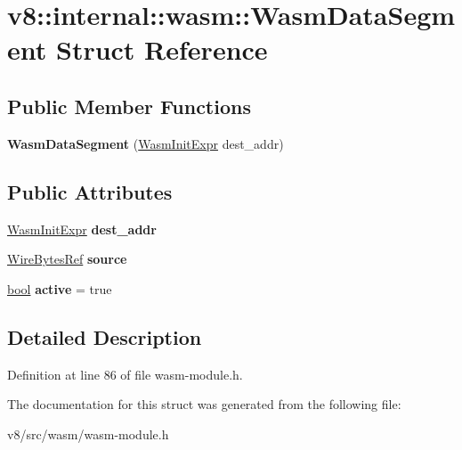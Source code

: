 \hypertarget{structv8_1_1internal_1_1wasm_1_1WasmDataSegment}{}\section{v8\+:\+:internal\+:\+:wasm\+:\+:Wasm\+Data\+Segment Struct Reference}
\label{structv8_1_1internal_1_1wasm_1_1WasmDataSegment}
\subsection*{Public Member Functions}
\begin{DoxyCompactItemize}
\item 
\mbox{\label{structv8_1_1internal_1_1wasm_1_1WasmDataSegment_ad3c55e5f1f4ba3ac91b1ef29c3990f75}} 
{\bfseries Wasm\+Data\+Segment} (\mbox{\hyperlink{structv8_1_1internal_1_1wasm_1_1WasmInitExpr}{Wasm\+Init\+Expr}} dest\+\_\+addr)
\end{DoxyCompactItemize}
\subsection*{Public Attributes}
\begin{DoxyCompactItemize}
\item 
\mbox{\label{structv8_1_1internal_1_1wasm_1_1WasmDataSegment_a1dded0e91177c4ba7d1f041f557d72dc}} 
\mbox{\hyperlink{structv8_1_1internal_1_1wasm_1_1WasmInitExpr}{Wasm\+Init\+Expr}} {\bfseries dest\+\_\+addr}
\item 
\mbox{\label{structv8_1_1internal_1_1wasm_1_1WasmDataSegment_ad002288f070d114ec32dd93c4874ee5b}} 
\mbox{\hyperlink{classv8_1_1internal_1_1wasm_1_1WireBytesRef}{Wire\+Bytes\+Ref}} {\bfseries source}
\item 
\mbox{\label{structv8_1_1internal_1_1wasm_1_1WasmDataSegment_a12e17e3fa84bb4207424e2b348187aa8}} 
\mbox{\hyperlink{classbool}{bool}} {\bfseries active} = true
\end{DoxyCompactItemize}


\subsection{Detailed Description}


Definition at line 86 of file wasm-\/module.\+h.



The documentation for this struct was generated from the following file\+:\begin{DoxyCompactItemize}
\item 
v8/src/wasm/wasm-\/module.\+h\end{DoxyCompactItemize}
